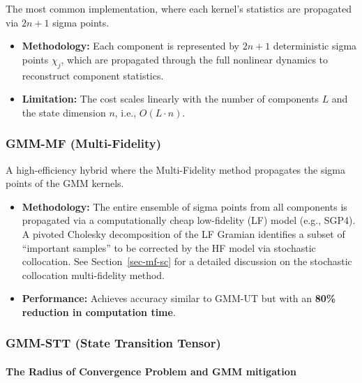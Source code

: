 \documentclass[
  letterpaper,
  DIV=11,
  numbers=noendperiod,
  oneside]{scrartcl}
\makeatletter
\let\oldparagraph\paragraph
\renewcommand{\paragraph}{
    \@ifstar
      \xxxParagraphStar
      \xxxParagraphNoStar
  }
\newcommand{\xxxParagraphStar}[1]{\oldparagraph*{#1}\mbox{}}
\newcommand{\xxxParagraphNoStar}[1]{\oldparagraph{#1}\mbox{}}
\makeatother
\begin{document}
The most common implementation, where each kernel's statistics are
propagated via \(2n+1\) sigma points.

\begin{itemize}
\item
  \textbf{Methodology:} Each component is represented by \(2n+1\)
  deterministic sigma points \(\chi_j\), which are propagated through
  the full nonlinear dynamics to reconstruct component statistics.
\item
  \textbf{Limitation:} The cost scales linearly with the number of
  components \(L\) and the state dimension \(n\), i.e.,
  \(O(L \cdot n)\).
\end{itemize}

\subsubsection{GMM-MF (Multi-Fidelity)}\label{gmm-mf-multi-fidelity}

A high-efficiency hybrid where the Multi-Fidelity method propagates the
sigma points of the GMM kernels.

\begin{itemize}
\item
  \textbf{Methodology:} The entire ensemble of sigma points from all
  components is propagated via a computationally cheap low-fidelity (LF)
  model (e.g., SGP4). A pivoted Cholesky decomposition of the LF Gramian
  identifies a subset of ``important samples'' to be corrected by the HF
  model via stochastic collocation. See Section~\ref{sec-mf-sc} for a
  detailed discussion on the stochastic collocation multi-fidelity
  method.
\item
  \textbf{Performance:} Achieves accuracy similar to GMM-UT but with an
  \textbf{80\% reduction in computation time}.
\end{itemize}

\subsubsection{GMM-STT (State Transition
Tensor)}\label{gmm-stt-state-transition-tensor}

\paragraph{\texorpdfstring{\textbf{The Radius of Convergence Problem and
GMM
mitigation}}{The Radius of Convergence Problem and GMM mitigation}}\label{the-radius-of-convergence-problem-and-gmm-mitigation}
\end{document}
